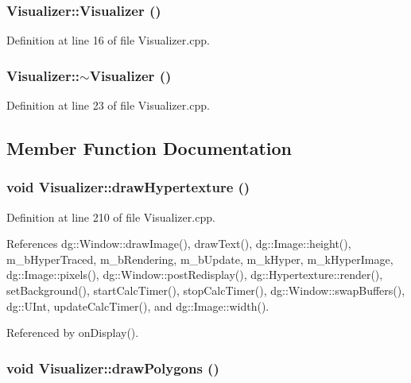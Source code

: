 \subsubsection{\setlength{\rightskip}{0pt plus 5cm}Visualizer::Visualizer ()}\label{classdg_1_1Visualizer_a0}




Definition at line 16 of file Visualizer.cpp.
\subsubsection{\setlength{\rightskip}{0pt plus 5cm}Visualizer::$\sim$Visualizer ()\hspace{0.3cm}{\tt  [virtual]}}\label{classdg_1_1Visualizer_a1}




Definition at line 23 of file Visualizer.cpp.

\subsection{Member Function Documentation}
\subsubsection{\setlength{\rightskip}{0pt plus 5cm}void Visualizer::draw\-Hypertexture ()}\label{classdg_1_1Visualizer_a14}




Definition at line 210 of file Visualizer.cpp.

References dg::Window::draw\-Image(), draw\-Text(), dg::Image::height(), m\_\-b\-Hyper\-Traced, m\_\-b\-Rendering, m\_\-b\-Update, m\_\-k\-Hyper, m\_\-k\-Hyper\-Image, dg::Image::pixels(), dg::Window::post\-Redisplay(), dg::Hypertexture::render(), set\-Background(), start\-Calc\-Timer(), stop\-Calc\-Timer(), dg::Window::swap\-Buffers(), dg::UInt, update\-Calc\-Timer(), and dg::Image::width().

Referenced by on\-Display().
\subsubsection{\setlength{\rightskip}{0pt plus 5cm}void Visualizer::draw\-Polygons ()}\label{classdg_1_1Visualizer_a12}




